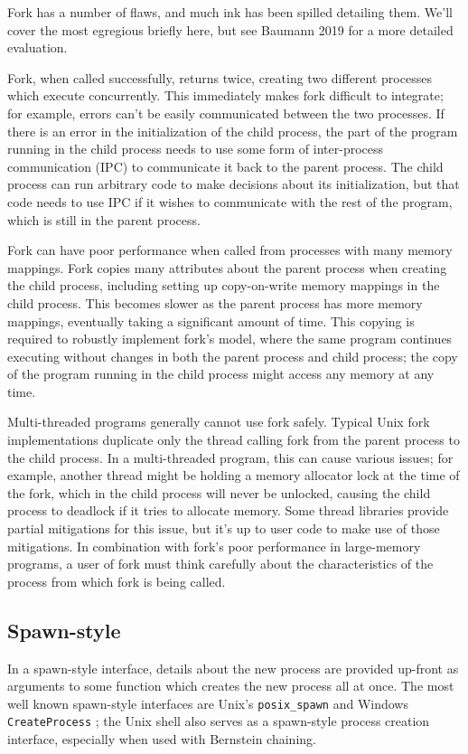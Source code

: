\documentclass[letterpaper,twocolumn,10pt]{article}
\begin{document}
Fork has a number of flaws,
and much ink has been spilled detailing them.
We'll cover the most egregious briefly here,
but see Baumann 2019 \cite{forkroad} for a more detailed evaluation.

Fork, when called successfully, returns twice,
creating two different processes which execute concurrently.
This immediately makes fork difficult to integrate;
for example, errors can't be easily communicated between the two processes.
If there is an error in the initialization of the child process,
the part of the program running in the child process
needs to use some form of inter-process communication (IPC) to communicate it back to the parent process.
The child process can run arbitrary code to make decisions about its initialization,
but that code needs to use IPC if it wishes to communicate with the rest of the program,
which is still in the parent process.

Fork can have poor performance when called from processes with many memory mappings.\cite{forkroad}
Fork copies many attributes about the parent process when creating the child process,
including setting up copy-on-write memory mappings in the child process.
This becomes slower as the parent process has more memory mappings,
eventually taking a significant amount of time.
This copying is required to robustly implement fork's model,
where the same program continues executing without changes in both the parent process and child process;
the copy of the program running in the child process might access any memory at any time.

Multi-threaded programs generally cannot use fork safely.
Typical Unix fork implementations duplicate only the thread calling fork from the parent process to the child process.
In a multi-threaded program, this can cause various issues;
for example, another thread might be holding a memory allocator lock at the time of the fork,
which in the child process will never be unlocked,
causing the child process to deadlock if it tries to allocate memory.
Some thread libraries provide partial mitigations for this issue,
but it's up to user code to make use of those mitigations.\cite{pthread_atfork}
In combination with fork's poor performance in large-memory programs,
a user of fork must think carefully
about the characteristics of the process from which fork is being called.
\subsection{Spawn-style}
In a spawn-style interface,
details about the new process are provided up-front as arguments to some function
which creates the new process all at once.
The most well known spawn-style interfaces are Unix's \texttt{posix\_spawn} \cite{posix_spawn}
and Windows \texttt{CreateProcess} \cite{create_process};
the Unix shell also serves as a spawn-style process creation interface,
especially when used with Bernstein chaining\cite{chainloading}.
\end{document}
